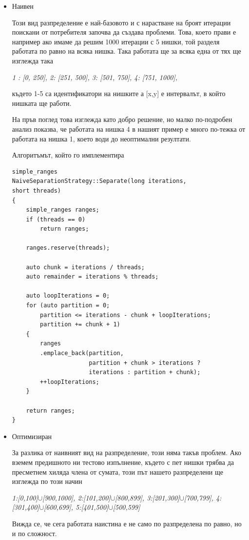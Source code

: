 \documentclass[a4paper,english]{article}
\begin{document}
        \begin{itemize}
        \item Наивен\hfill
        
        \vspace{3mm}
            Този вид разпределение е най-базовото и с нарастване на броят итерации поискани от потребителя започва да създава проблеми. Това, което прави е например ако имаме да решим 1000 итерации с 5 нишки, той разделя работата по равно на всяка нишка. Така работата ще за всяка една от тях ще изглежда така\hfill
            \begin{center}
                \textit{1 : [0, 250], 2: [251, 500], 3: [501, 750], 4: [751, 1000],}
            \end{center}
            където 1-5 са идентификатори на нишките а [x,y] е интервалът, в който нишката ще работи.\hfill
            
            На пръв поглед това изглежда като добро решение, но малко по-подробен анализ показва, че работата на нишка 4 в нашият пример е много по-тежка от работата на нишка 1, което води до неоптимални резултати.\hfill
            
            Алгоритъмът, който го имплементира
            \begin{lstlisting}
simple_ranges
NaiveSeparationStrategy::Separate(long iterations,
short threads)
{
	simple_ranges ranges;
	if (threads == 0)
		return ranges;

	ranges.reserve(threads);

	auto chunk = iterations / threads;
	auto remainder = iterations % threads;

	auto loopIterations = 0;
	for (auto partition = 0; 
	    partition <= iterations - chunk + loopIterations; 
	    partition += chunk + 1)
	{
		ranges
		.emplace_back(partition, 
		              partition + chunk > iterations ?
		              iterations : partition + chunk);
		++loopIterations;
	}

	return ranges;
}
            \end{lstlisting}
            
        \item Оптимизиран\hfill
        
        \vspace{3mm}
            За разлика от наивният вид на разпределение, този няма такъв проблем. Ако вземем предишното ни тестово изпълнение, където с пет нишки трябва да пресметнем хиляда члена от сумата, този път нашето разпределени ще изглежда по този начин
            \begin{center}
                \textit{1:[0,100]\(\cup\)[900,1000], 2:[101,200]\(\cup\)[800,899], 3:[201,300]\(\cup\)[700,799], 4:[301,400]\(\cup\)[600,699], 5:[401,500]\(\cup\)[500,599]}
            \end{center}
            Вижда се, че сега работата наистина е не само по разпределена по равно, но и по сложност.\hfill
            

\end{itemize}
\end{document}

